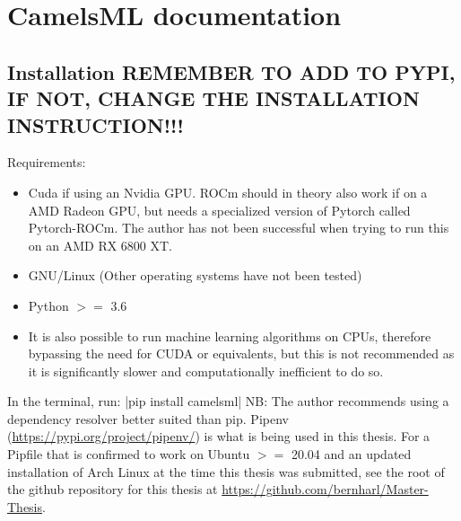 \section{CamelsML documentation}
\label{camelsml documentation}
\subsection{Installation REMEMBER TO ADD TO PYPI, IF NOT, CHANGE THE INSTALLATION INSTRUCTION!!!}
Requirements:
\begin{itemize}
    \item Cuda if using an Nvidia GPU. ROCm should in theory also work if on a AMD Radeon GPU, but needs a specialized version of Pytorch called Pytorch-ROCm. The author has not been successful when trying to run this on an AMD RX 6800 XT.
    \item GNU/Linux (Other operating systems have not been tested)
    \item Python $>=$ 3.6
    \item It is also possible to run machine learning algorithms on CPUs, therefore bypassing the need for CUDA or equivalents, but this is not recommended as it is significantly slower and computationally inefficient to do so.
\end{itemize}
In the terminal, run:
|pip install camelsml|
NB: The author recommends using a dependency resolver better suited than pip. 
Pipenv (\url{https://pypi.org/project/pipenv/}) is what is being used in this thesis.
For a Pipfile that is confirmed to work on Ubuntu $>=$ 20.04 and an updated installation of Arch Linux at the time this thesis was submitted, 
see the root of the github repository for this thesis at \url{https://github.com/bernharl/Master-Thesis}.
